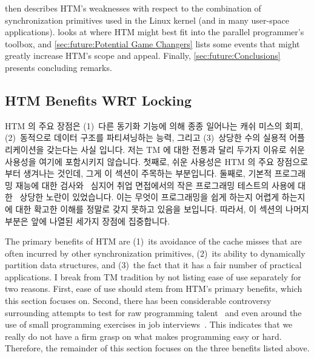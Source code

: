  then describes
HTM's weaknesses with respect to the combination of synchronization
primitives used in the Linux kernel (and in many user-space applications).
 looks at where HTM
might best fit into the parallel programmer's toolbox, and
\cref{sec:future:Potential Game Changers} lists some events that might
greatly increase HTM's scope and appeal.
Finally, \cref{sec:future:Conclusions}
presents concluding remarks.

\fi

\subsection{HTM Benefits WRT Locking}
\label{sec:future:HTM Benefits WRT Locking}

HTM 의 주요 장점은
(1)~다른 동기화 기능에 의해 종종 일어나는 캐쉬 미스의 회피,
(2)~동적으로 데이터 구조를 파티셔닝하는 능력, 그리고
(3)~상당한 수의 실용적 어플리케이션을 갖는다는 사실 입니다.
저는 TM 에 대한 전통과 달리 두가지 이유로 쉬운 사용성을 여기에 포함시키지
않습니다.
첫째로, 쉬운 사용성은 HTM 의 주요 장점으로부터 생겨나는 것인데, 그게 이 섹션이
주목하는 부분입니다.
둘째로, 기본적 프로그래밍 재능에 대한
검사와~\cite{RichardBornat2006SheepGoats,SaeedDehnadi2009SheepGoats,ElizabethPatitsas2020GradesNotBimodal}
심지어 취업 면접에서의 작은 프로그래밍 테스트의 사용에
대한~\cite{RegBraithwaite2007FizzBuzz} 상당한 노란이 있었습니다.
이는 무엇이 프로그래밍을 쉽게 하는지 어렵게 하는지에 대한 확고한 이해를 정말로
갖지 못하고 있음을 보입니다.
따라서, 이 섹션의 나머지 부분은 앞에 나열된 세가지 장점에 집중합니다.

\iffalse

The primary benefits of HTM are
(1)~its avoidance of the cache misses that are often incurred by
other synchronization primitives,
(2)~its ability to dynamically partition
data structures,
and (3)~the fact that it has
a fair number of practical applications.
I break from TM tradition by not listing ease of use separately
for two reasons.
First, ease of use should stem from HTM's primary benefits,
which this section focuses on.
Second, there has been considerable controversy surrounding attempts to
test for raw programming
talent~\cite{RichardBornat2006SheepGoats,SaeedDehnadi2009SheepGoats,ElizabethPatitsas2020GradesNotBimodal}
and even around the use of small programming exercises in job
interviews~\cite{RegBraithwaite2007FizzBuzz}.
This indicates that we really do not have a firm grasp on what makes
programming easy or hard.
Therefore, the remainder of this section focuses on the three benefits
listed above.

